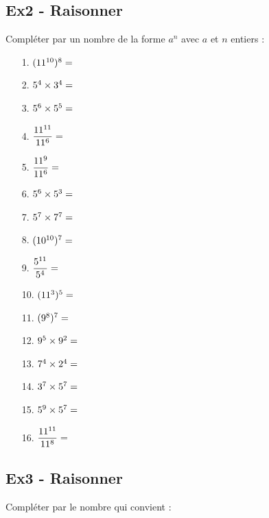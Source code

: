 \documentclass[12pt]{article}
\begin{document}
\subsection*{Ex2 - Raisonner}

Compléter par un nombre de la forme $a^n$ avec $a$ et $n$ entiers :

\begin{multicols}{4}
  \begin{enumerate}
  \item[1.] $(11^{10})^{8} = \dotfill$
  \item[2.] $5^{4}  \times  3^{4}  =  \dotfill$
  \item[3.] $5^{6} \times 5^{5} = \dotfill$
  \item[4.] $\dfrac{11^{11}}{11^{6}} = \dotfill$
  \item[5.] $\dfrac{11^{9}}{11^{6}} = \dotfill$
  \item[6.] $5^{6} \times 5^{3} = \dotfill$
  \item[7.] $5^{7}  \times  7^{7}  =  \dotfill$
  \item[8.] $(10^{10})^{7} = \dotfill$
  \item[9.] $\dfrac{5^{11}}{5^{4}} = \dotfill$
  \item[10.] $(11^{3})^{5} = \dotfill$
  \item[11.] $(9^{8})^{7} = \dotfill$
  \item[12.] $9^{5} \times 9^{2} = \dotfill$
  \item[13.] $7^{4}  \times  2^{4}  =  \dotfill$
  \item[14.] $3^{7}  \times  5^{7}  =  \dotfill$
  \item[15.] $5^{9} \times 5^{7} = \dotfill$
  \item[16.] $\dfrac{11^{11}}{11^{8}} = \dotfill$
  \end{enumerate}
\end{multicols}


\subsection*{Ex3 - Raisonner}
Compléter par le nombre qui convient :
\end{document}

